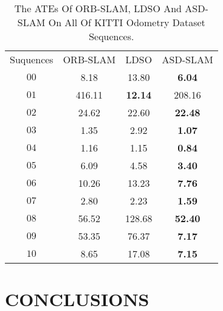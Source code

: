 \documentclass[letterpaper, 10 pt, conference]{ieeeconf}  %
\begin{document}
\begin{table}[t]
\caption{The ATEs Of ORB-SLAM, LDSO And ASD-SLAM On All Of KITTI Odometry Dataset Sequences.}
\begin{center}
\begin{tabular}{cccc}
\toprule
\hline
\multirow{1}{*}{Suquences} & \multicolumn{1}{c}{ORB-SLAM} & \multicolumn{1}{c}{LDSO} & \multicolumn{1}{c}{ASD-SLAM} \\
$00 $             &8.18                      & 13.80                    & \textbf{6.04}                   \\
$01 $             &416.11                          &\textbf{12.14}                   & 208.16                   \\
$02 $             &24.62                          & 22.60                    & \textbf{22.48}                   \\
$03 $             &1.35                         & 2.92                    & \textbf{1.07}                   \\
$04 $             &1.16                          &1.15                    & \textbf{0.84}                   \\
$05 $             &6.09                          & 4.58                 & \textbf{3.40}                   \\
$06 $             &10.26                          & 13.23                    & \textbf{7.76}                   \\
$07 $             &2.80                          & 2.23                   & \textbf{1.59}                 \\
$08 $             &56.52                         &128.68                   &\textbf{52.40}                   \\
$09 $             &53.35                        & 76.37                   &\textbf{7.17}                  \\
$10 $             &8.65                         &17.08                    & \textbf{7.15}                 \\
\hline
\hline
\toprule
\end{tabular} 
\end{center}
\end{table}\vspace{0in}



\section{CONCLUSIONS}
\end{document}
